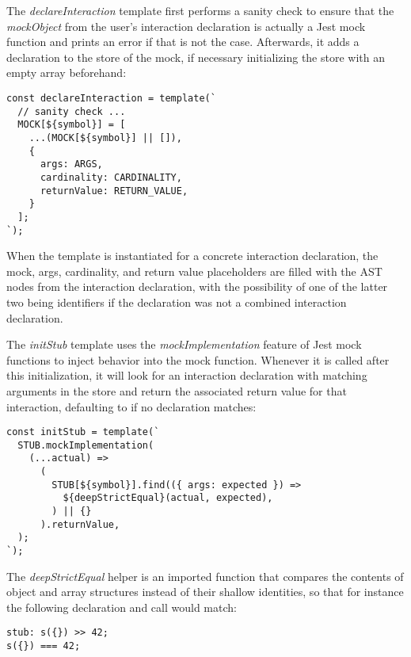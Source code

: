 The \textit{declareInteraction} template first
performs a sanity check to ensure that
the \textit{mockObject} from the user's interaction declaration
is actually a Jest mock function and
prints an error if that is not the case.
Afterwards, it adds a declaration to the store of the mock,
if necessary initializing the store with an empty array beforehand:
\begin{verbatim}
const declareInteraction = template(`
  // sanity check ...
  MOCK[${symbol}] = [
    ...(MOCK[${symbol}] || []),
    {
      args: ARGS,
      cardinality: CARDINALITY,
      returnValue: RETURN_VALUE,
    }
  ];
`);
\end{verbatim}
When the template is instantiated for a concrete interaction declaration,
the mock, args, cardinality, and return value placeholders
are filled with the AST nodes from the interaction declaration,
with the possibility of one of the latter two being  identifiers
if the declaration was not a combined interaction declaration.

The \textit{initStub} template uses
the \textit{mockImplementation} feature of Jest mock functions
to inject behavior into the mock function.
Whenever it is called after this initialization,
it will look for an interaction declaration
with matching arguments in the store
and return the associated return value for that interaction,
defaulting to  if no declaration matches:
\begin{verbatim}
const initStub = template(`
  STUB.mockImplementation(
    (...actual) =>
      (
        STUB[${symbol}].find(({ args: expected }) =>
          ${deepStrictEqual}(actual, expected),
        ) || {}
      ).returnValue,
  );
`);
\end{verbatim}
The \textit{deepStrictEqual} helper is an imported function
that compares the contents of object and array structures
instead of their shallow identities,
so that for instance the following declaration and call would match:
\begin{verbatim}
stub: s({}) >> 42;
s({}) === 42;
\end{verbatim}

